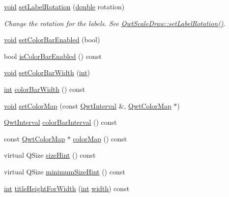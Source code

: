 \begin{DoxyCompactItemize}
\hyperlink{group___u_a_v_objects_plugin_ga444cf2ff3f0ecbe028adce838d373f5c}{void} \hyperlink{class_qwt_scale_widget_aea277057b98a66ee8038f6a827e0f404}{set\-Label\-Rotation} (\hyperlink{_super_l_u_support_8h_a8956b2b9f49bf918deed98379d159ca7}{double} rotation)
\begin{DoxyCompactList}\small\item\em Change the rotation for the labels. See \hyperlink{class_qwt_scale_draw_abf5881339fddde65a00c1dd391023320}{Qwt\-Scale\-Draw\-::set\-Label\-Rotation()}. \end{DoxyCompactList}\item 
\hyperlink{group___u_a_v_objects_plugin_ga444cf2ff3f0ecbe028adce838d373f5c}{void} \hyperlink{class_qwt_scale_widget_aeb337b8e67fc00ca98bf39a6d70aea61}{set\-Color\-Bar\-Enabled} (bool)
\item 
bool \hyperlink{class_qwt_scale_widget_a0572bc26f5b99654067b916001bce582}{is\-Color\-Bar\-Enabled} () const 
\item 
\hyperlink{group___u_a_v_objects_plugin_ga444cf2ff3f0ecbe028adce838d373f5c}{void} \hyperlink{class_qwt_scale_widget_a76eb179267a572944d1ebdbf62c573f1}{set\-Color\-Bar\-Width} (\hyperlink{ioapi_8h_a787fa3cf048117ba7123753c1e74fcd6}{int})
\item 
\hyperlink{ioapi_8h_a787fa3cf048117ba7123753c1e74fcd6}{int} \hyperlink{class_qwt_scale_widget_aa5877851d15888977621bfe86b945984}{color\-Bar\-Width} () const 
\item 
\hyperlink{group___u_a_v_objects_plugin_ga444cf2ff3f0ecbe028adce838d373f5c}{void} \hyperlink{class_qwt_scale_widget_a3cfd919d042007accd3fdb3fcd75045c}{set\-Color\-Map} (const \hyperlink{class_qwt_interval}{Qwt\-Interval} \&, \hyperlink{class_qwt_color_map}{Qwt\-Color\-Map} $\ast$)
\item 
\hyperlink{class_qwt_interval}{Qwt\-Interval} \hyperlink{class_qwt_scale_widget_a45d81f98abea564eca1ec72dd56edaae}{color\-Bar\-Interval} () const 
\item 
const \hyperlink{class_qwt_color_map}{Qwt\-Color\-Map} $\ast$ \hyperlink{class_qwt_scale_widget_aacbe3acb087a109d9df21062bf5f1726}{color\-Map} () const 
\item 
virtual Q\-Size \hyperlink{class_qwt_scale_widget_a5ed815b5ac0ed7d43ab923fcd1f5da3d}{size\-Hint} () const 
\item 
virtual Q\-Size \hyperlink{class_qwt_scale_widget_aee41cd1b3eff4cf06559e7a36baee5a5}{minimum\-Size\-Hint} () const 
\item 
\hyperlink{ioapi_8h_a787fa3cf048117ba7123753c1e74fcd6}{int} \hyperlink{class_qwt_scale_widget_a1c488b9304a8e30af20e4da1d397a72f}{title\-Height\-For\-Width} (\hyperlink{ioapi_8h_a787fa3cf048117ba7123753c1e74fcd6}{int} \hyperlink{glext_8h_a76aaa5c50746272e7d2de9aece921757}{width}) const 

\end{DoxyCompactItemize}
